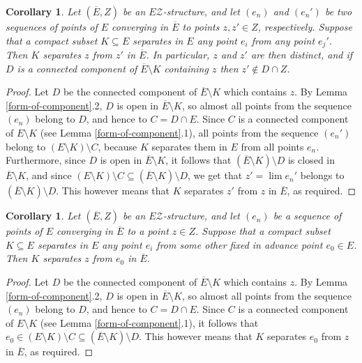 \documentclass[12pt, a4paper]{article}
\newcommand{\8}{\infty}
\theoremstyle{break}
\newtheorem{cor}[thm]{Corollary}
\theoremstyle{defbreak}
\newcommand{\ol}[1]{\overline{#1}}
\begin{document}
\begin{cor}\label{separation-of-two-limits}
Let $(\ol E,Z)$ be an $E\mathcal{Z}$-structure, and let 
$(e_n)$ and $(e_n')$ be two sequences of points of $E$
converging in $\ol E$ to points $z,z'\in Z$, respectively. 
Suppose that a compact subset $K\subseteq E$ separates in $E$
any point $e_i$ from any point $e_j'$. Then $K$ separates $z$
from $z'$ in $\ol E$. In particular, $z$ and $z'$ are then distinct,
and if $D$ is a connected component of $\ol E\setminus K$
containing $z$ then 
$z'\notin D\cap Z$. 
\end{cor}

\begin{proof}
Let $D$ be the connected component of $\ol E\setminus K$ which
contains $z$. By Lemma \ref{form-of-component}.2, 
$D$ is open in $\ol E\setminus K$,
so almost all points from the sequence $(e_n)$ belong to $D$,
and hence to $C=D\cap E$. Since $C$ is a connected component
of $E\setminus K$ (see Lemma \ref{form-of-component}.1), 
all points from the sequence
$(e_n')$ belong to $(E\setminus K)\setminus C$, because $K$ separates them 
in $E$ from all points $e_n$. Furthermore, since $D$ is open in 
$\ol E\setminus K$, it follows that $(\ol E\setminus K)\setminus D$
is closed in $\ol E\setminus K$, and since
$(E\setminus K)\setminus C\subseteq(\ol E\setminus K)\setminus D$,
we get that $z'=\lim e_n'$ belongs to $(\ol E\setminus K)\setminus D$.
This however means that $K$ separates $z'$ from $z$ in $\ol E$,
as required.
\end{proof}

\begin{cor}\label{separation-of-limit}
Let $(\ol E,Z)$ be an $E\mathcal{Z}$-structure, and let 
$(e_n)$ be a sequence of points of $E$
converging in $\ol E$ to a point $z\in Z$. 
Suppose that a compact subset $K\subseteq E$ separates in $E$
any point $e_i$ from some other fixed in advance point $e_0\in E$. Then $K$ separates $z$
from $e_0$ in $\ol E$.
\end{cor}

\begin{proof}
Let $D$ be the connected component of $\ol E\setminus K$ which
contains $z$. By Lemma \ref{form-of-component}.2, 
$D$ is open in $\ol E\setminus K$,
so almost all points from the sequence $(e_n)$ belong to $D$,
and hence to $C=D\cap E$. Since $C$ is a connected component
of $E\setminus K$ (see Lemma \ref{form-of-component}.1), 
it follows that 
$e_0\in(E\setminus K)\setminus C\subseteq(\ol E\setminus K)\setminus D$.
This however means that $K$ separates $e_0$ from $z$ in $\ol E$,
as required.
\end{proof}
\end{document}
